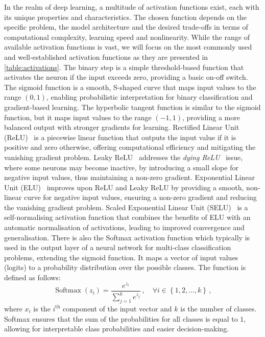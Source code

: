 In the realm of deep learning, a multitude of activation functions exist, each with its unique properties and characteristics. The chosen function depends on the specific problem, the model architecture and the desired trade-offs in terms of computational complexity, learning speed and nonlinearity. While the range of available activation functions is vast, we will focus on the most commonly used and well-established activation functions as they are presented in \autoref{table:activations}. The binary step is a simple threshold-based function that activates the neuron if the input exceeds zero, providing a basic on-off switch. The sigmoid function is a smooth, S-shaped curve that maps input values to the range $(0, 1)$, enabling probabilistic interpretation for binary classification and gradient-based learning. The hyperbolic tangent function is similar to the sigmoid function, but it maps input values to the range $(-1, 1)$, providing a more balanced output with stronger gradients for learning. Rectified Linear Unit (ReLU)~\supercite{relu} is a piecewise linear function that outputs the input value if it is positive and zero otherwise, offering computational efficiency and mitigating the vanishing gradient problem. Leaky ReLU~\supercite{leakyrelu} addresses the \textit{dying ReLU}~\supercite{dyingrelu} issue, where some neurons may become inactive, by introducing a small slope for negative input values, thus maintaining a non-zero gradient. Exponential Linear Unit (ELU)~\supercite{elu} improves upon ReLU and Leaky ReLU by providing a smooth, non-linear curve for negative input values, ensuring a non-zero gradient and reducing the vanishing gradient problem. Scaled Exponential Linear Unit (SELU)~\supercite{selu} is a self-normalising activation function that combines the benefits of ELU with an automatic normalisation of activations, leading to improved convergence and generalisation. There is also the Softmax activation function which typically is used in the output layer of a neural network for multi-class classification problems, extending the sigmoid function. It maps a vector of input values (logits) to a probability distribution over the possible classes. The function is defined as follows:
\begin{equation}
    \operatorname{Softmax}(z_i) = \frac{e^{z_i}}{\sum_{j=1}^k e^{z_j}}\,,\quad \forall i \in \left\{ 1, 2, \ldots, k \right\}  \,,
\end{equation}
where $x_i$ is the $i^\text{th}$ component of the input vector and $k$ is the number of classes. Softmax ensures that the sum of the probabilities for all classes is equal to $1$, allowing for interpretable class probabilities and easier decision-making.

